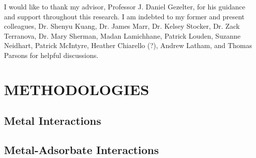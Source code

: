 \documentclass[final, numrefs]{nddiss2e}
\begin{document}
\begin{acknowledge}
I would like to thank my advisor, Professor J. Daniel Gezelter, for his
guidance and support throughout this research.
I am indebted to my former and present colleagues, Dr. Shenyu Kuang, Dr. James
Marr, Dr. Kelsey Stocker, Dr. Zack Terranova, Dr. Mary Sherman, Madan
Lamichhane, Patrick Louden, Suzanne Neidhart, Patrick McIntyre, Heather
Chiarello (?), Andrew Latham, and Thomas Parsons for helpful discussions. 
\end{acknowledge}

\mainmatter


\chapter{METHODOLOGIES}

\section{Metal Interactions}

\section{Metal-Adsorbate Interactions}
% 
\end{document}
